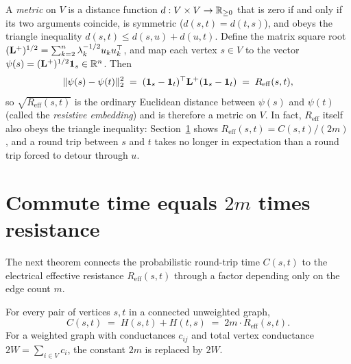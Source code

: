 \begin{remark}\label{ch35:rem-metric}
A \emph{metric} on $V$ is a distance function $d:V\times V\to\mathbb{R}_{\ge 0}$ that is zero if and only if its two arguments coincide, is symmetric ($d(s,t)=d(t,s)$), and obeys the triangle inequality $d(s,t)\le d(s,u)+d(u,t)$. Define the matrix square root $(\mathbf{L}^+)^{1/2} = \sum_{k=2}^n \lambda_k^{-1/2}u_k u_k^\top$, and map each vertex $s\in V$ to the vector $\psi(s)=(\mathbf{L}^+)^{1/2}\mathbf{1}_s\in\mathbb{R}^n$. Then
\[
  \lVert\psi(s)-\psi(t)\rVert_2^2 \;=\; (\mathbf{1}_s-\mathbf{1}_t)^\top \mathbf{L}^+(\mathbf{1}_s-\mathbf{1}_t) \;=\; R_{\mathrm{eff}}(s,t),
\]
so $\sqrt{R_{\mathrm{eff}}(s,t)}$ is the ordinary Euclidean distance between $\psi(s)$ and $\psi(t)$ (called the \emph{resistive embedding}) and is therefore a metric on $V$. In fact, $R_{\mathrm{eff}}$ itself also obeys the triangle inequality: Section~\ref{ch35:commute} shows $R_{\mathrm{eff}}(s,t)=C(s,t)/(2m)$, and a round trip between $s$ and $t$ takes no longer in expectation than a round trip forced to detour through $u$.
\end{remark}

\section{Commute time equals \texorpdfstring{$2m$}{2m} times resistance}\label{ch35:commute}

The next theorem connects the probabilistic round-trip time $C(s,t)$ to the electrical effective resistance $R_{\mathrm{eff}}(s,t)$ through a factor depending only on the edge count $m$.

\begin{theorem}\label{ch35:thm-commute}
For every pair of vertices $s,t$ in a connected unweighted graph,
\[
  C(s,t)\;=\;H(s,t)+H(t,s)\;=\;2m\cdot R_{\mathrm{eff}}(s,t).
\]
For a weighted graph with conductances $c_{ij}$ and total vertex conductance $2W=\sum_{i\in V}c_i$, the constant $2m$ is replaced by $2W$.
\end{theorem}

